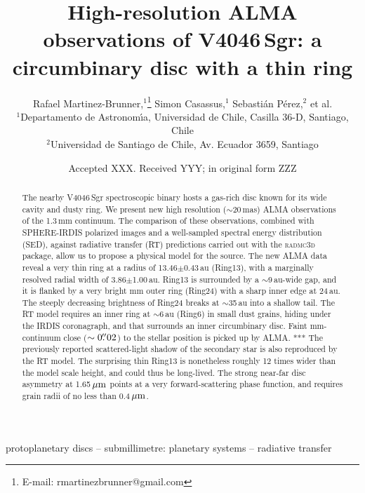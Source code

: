 \documentclass[letters,usenatbib,times]{mnras}
\title[High-resolution ALMA observations of V4046\,Sgr]{High-resolution ALMA observations of V4046\,Sgr: a circumbinary disc with a thin ring}
\author[R. Martinez Brunner et al.]{
Rafael Martinez-Brunner,$^{1}$\thanks{E-mail: rmartinezbrunner@gmail.com}
Simon Casassus,$^{1}$
Sebasti\'an P\'erez,$^{2}$
et al. 
\\
$^{1}$Departamento de Astronom\'{\i}a, Universidad de Chile, Casilla 36-D, Santiago, Chile\\
$^{2}$Universidad de Santiago de Chile, Av. Ecuador 3659, Santiago\\
}
\date{Accepted XXX. Received YYY; in original form ZZZ}
\begin{document}
\label{firstpage}
\pagerange{\pageref{firstpage}--\pageref{lastpage}}
\maketitle

\begin{abstract}
  The nearby V4046\,Sgr spectroscopic binary hosts a gas-rich disc known for its wide cavity and dusty ring. We present new high resolution ($\sim$20\,mas) ALMA observations of the 1.3\,mm continuum. The comparison of these observations, combined with SPHERE-IRDIS polarized images and a well-sampled spectral energy distribution (SED), against radiative transfer (RT) predictions carried out with the \textsc{radmc3d} package, allow us to propose a physical model for the source. The new ALMA data reveal a very thin ring at a radius of 13.46$\pm$0.43\,au (Ring13), with a marginally resolved radial width of 3.86$\pm$1.00\,au. Ring13 is surrounded by a $\sim$9\,au-wide gap, and it is flanked by a very bright mm outer ring (Ring24) with a sharp inner edge at 24\,au. The steeply decreasing brightness of Ring24 breaks at $\sim$35\,au into a shallow tail. The RT model requires an inner ring at $\sim$6\,au (Ring6) in small dust grains, hiding under the IRDIS coronagraph, and that surrounds an inner circumbinary disc. Faint mm-continuum close ($\sim0\hbox{$.\!\!^{\prime\prime}$}02$) to the stellar position is picked up by ALMA. ***
  The previously reported scattered-light shadow of the secondary star is also reproduced by the RT model. The surprising thin Ring13 is nonetheless roughly 12 times wider than the model scale height, and could thus be long-lived. The strong near-far disc asymmetry at 1.65\,$\hbox{$\mu$m}$ points at a very forward-scattering phase function, and requires grain radii of no less than 0.4\,$\hbox{$\mu$m}$. 
\end{abstract}

\begin{keywords}
 protoplanetary discs -- submillimetre: planetary systems -- radiative transfer
\end{keywords}


\end{document}
